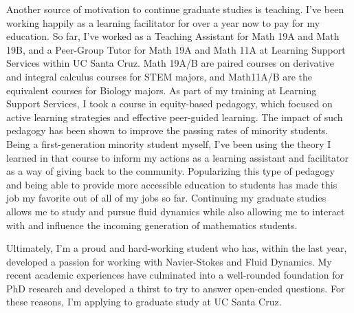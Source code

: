 \documentclass{article}
\begin{document}
Another source of motivation to continue graduate studies is teaching. I've been working happily as a learning facilitator for over a year now to pay for my education. So far, I've worked as a Teaching Assistant for Math 19A and Math 19B, and a Peer-Group Tutor for Math 19A and Math 11A at Learning Support Services within UC Santa Cruz. Math 19A/B are paired courses on derivative and integral calculus courses for STEM majors, and Math11A/B are the equivalent courses for Biology majors. As part of my training at Learning Support Services, I took a course in equity-based pedagogy, which focused on active learning strategies and effective peer-guided learning. The impact of such pedagogy has been shown to improve the passing rates of minority students. Being a first-generation minority student myself, I've been using the theory I learned in that course to inform my actions as a learning assistant and facilitator as a way of giving back to the community. Popularizing this type of pedagogy and being able to provide more accessible education to students has made this job my favorite out of all of my jobs so far. Continuing my graduate studies allows me to study and pursue fluid dynamics while also allowing me to interact with and influence the incoming generation of mathematics students. 

Ultimately, I'm a proud and hard-working student who has, within the last year, developed a passion for working with Navier-Stokes and Fluid Dynamics. My recent academic experiences have culminated into a well-rounded foundation for PhD research and developed a thirst to try to answer open-ended questions. For these reasons, I'm applying to graduate study at UC Santa Cruz. 

\end{document}

